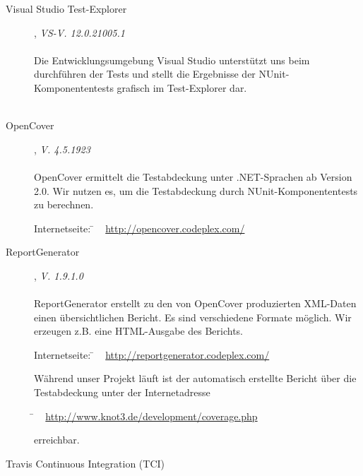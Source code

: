 \begin{description}

\item[Visual Studio Test-Explorer], \textit{VS-V. 12.0.21005.1}\hfill
	\\
	\\
	Die Entwicklungsumgebung Visual Studio unterstützt uns beim durchführen der Tests und stellt die Ergebnisse der NUnit-Komponententests grafisch im Test-Explorer dar.
	\\\\
	

\item[OpenCover], \textit{V. 4.5.1923}\hfill
	\\
	\\
	OpenCover ermittelt die Testabdeckung unter .NET-Sprachen ab Version 2.0. Wir nutzen es, um die Testabdeckung durch NUnit-Komponententests zu berechnen.
	
	\begin{tabbing}
		Internetseite:
		\= ~ \href {http://opencover.codeplex.com/}
	    	       {http://opencover.codeplex.com/} \\
	\end{tabbing}
	
	
	\item[ReportGenerator], \textit{V. 1.9.1.0}\hfill
	\\
	\\
	ReportGenerator erstellt zu den von OpenCover produzierten XML-Daten einen übersichtlichen Bericht. Es sind verschiedene Formate möglich. Wir erzeugen z.B. eine HTML-Ausgabe des Berichts.
	\begin{tabbing}
			Internetseite:
			\= ~ \href {http://reportgenerator.codeplex.com/}
		    	       {http://reportgenerator.codeplex.com/}
		    \\
	\end{tabbing}

	Während unser Projekt läuft ist der automatisch erstellte Bericht über die Testabdeckung unter der Internetadresse
	
	\begin{tabbing}
			\= ~ \href {http://www.knot3.de/development/coverage.php}
					   {http://www.knot3.de/development/coverage.php}
					   
	\end{tabbing} erreichbar.
	\\
	
	\item[Travis Continuous Integration (TCI)] \hfill
	\\
	

\end{description}
